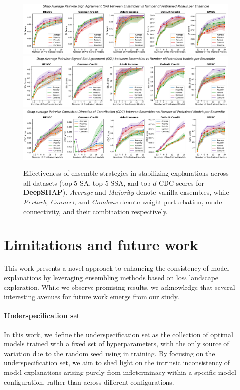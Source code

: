 \begin{figure}[ht]
    \centering
    \includegraphics[width=0.99\textwidth]{figures/sa_top5_shap.png}
    \includegraphics[width=0.99\textwidth]{figures/ssa_top5_shap.png}
    \includegraphics[width=0.99\textwidth]{figures/cdc_topd_shap.png}
    \caption{\small Effectiveness of ensemble strategies in stabilizing explanations across all datasets (top-5 SA, top-5 SSA, and top-$d$ CDC scores for \textbf{DeepSHAP}). \textit{Average} and \textit{Majority} denote vanilla ensembles, while \textit{Perturb}, \textit{Connect}, and \textit{Combine} denote weight perturbation, mode connectivity, and their combination respectively.}
    \label{fig:ensembles_all_shap}
\end{figure}

\section{Limitations and future work}
\label{app:limitations}

This work presents a novel approach to enhancing the consistency of model explanations by leveraging ensembling methods based on loss landscape exploration. While we observe promising results, we acknowledge that several interesting avenues for future work emerge from our study.

\paragraph{Underspecification set} In this work, we define the underspecification set as the collection of optimal models trained with a fixed set of hyperparameters, with the only source of variation due to the random seed using in training. By focusing on the underspecification set, we aim to shed light on the intrinsic inconsistency of model explanations arising purely from indeterminacy within a specific model configuration, rather than across different configurations.

